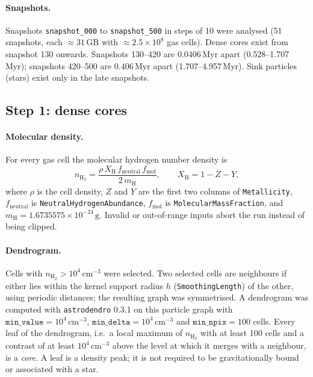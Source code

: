 \paragraph{Snapshots.} Snapshots \texttt{snapshot\_000} to \texttt{snapshot\_500} in steps of 10 were analysed
(51 snapshots, each $\approx 31\,\mathrm{GB}$ with $\approx 2.5\times10^{8}$ gas cells). Dense cores exist from
snapshot 130 onwards. Snapshots 130--420 are $0.0406\,\mathrm{Myr}$ apart (0.528--1.707\,Myr); snapshots
420--500 are $0.406\,\mathrm{Myr}$ apart (1.707--4.957\,Myr). Sink particles (stars) exist only in the late
snapshots.

\subsection{Step 1: dense cores}
\label{sec:dataset:cores}

\paragraph{Molecular density.} For every gas cell the molecular hydrogen number density is
\begin{equation}
  n_{\mathrm{H_2}} = \frac{\rho\, X_\mathrm{H}\, f_\mathrm{neutral}\, f_\mathrm{mol}}{2\,m_\mathrm{H}},\qquad
  X_\mathrm{H} = 1 - Z - Y,
  \label{eq:nh2}
\end{equation}
where $\rho$ is the cell density, $Z$ and $Y$ are the first two columns of \texttt{Metallicity},
$f_\mathrm{neutral}$ is \texttt{NeutralHydrogenAbundance}, $f_\mathrm{mol}$ is \texttt{MolecularMassFraction},
and $m_\mathrm{H}=1.6735575\times10^{-24}\,\mathrm{g}$. Invalid or out-of-range inputs abort the run instead of
being clipped.

\paragraph{Dendrogram.} Cells with $n_{\mathrm{H_2}} > 10^{4}\,\mathrm{cm^{-3}}$ were selected. Two selected cells
are neighbours if either lies within the kernel support radius $h$ (\texttt{SmoothingLength}) of the other,
using periodic distances; the resulting graph was symmetrised. A dendrogram \citep{Rosolowsky2008} was computed
with \texttt{astrodendro} 0.3.1 on this particle graph with
$\texttt{min\_value}=10^{4}\,\mathrm{cm^{-3}}$, $\texttt{min\_delta}=10^{4}\,\mathrm{cm^{-3}}$ and
$\texttt{min\_npix}=100$ cells. Every leaf of the dendrogram, i.e.\ a local maximum of $n_{\mathrm{H_2}}$
with at least 100 cells and a contrast of at least $10^{4}\,\mathrm{cm^{-3}}$ above the level at which it
merges with a neighbour, is a \emph{core}. A leaf is a density peak; it is not required to be gravitationally
bound or associated with a star.

